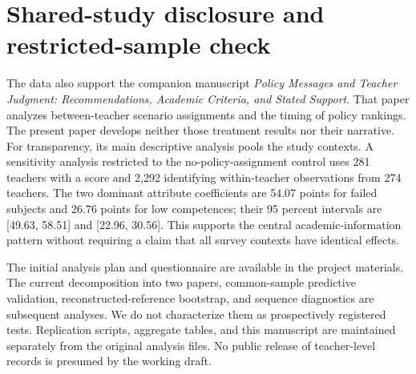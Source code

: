 \section{Shared-study disclosure and restricted-sample check}\label{app:scope}
\begin{addition}
The data also support the companion manuscript \textit{Policy Messages and Teacher Judgment: Recommendations, Academic Criteria, and Stated Support}. That paper analyzes between-teacher scenario assignments and the timing of policy rankings. The present paper develops neither those treatment results nor their narrative. For transparency, its main descriptive analysis pools the study contexts. A sensitivity analysis restricted to the no-policy-assignment control uses 281 teachers with a score and 2,292 identifying within-teacher observations from 274 teachers. The two dominant attribute coefficients are 54.07 points for failed subjects and 26.76 points for low competences; their 95 percent intervals are [49.63, 58.51] and [22.96, 30.56]. This supports the central academic-information pattern without requiring a claim that all survey contexts have identical effects.

The initial analysis plan and questionnaire are available in the project materials. The current decomposition into two papers, common-sample predictive validation, reconstructed-reference bootstrap, and sequence diagnostics are subsequent analyses. We do not characterize them as prospectively registered tests. Replication scripts, aggregate tables, and this manuscript are maintained separately from the original analysis files. No public release of teacher-level records is presumed by the working draft.
\end{addition}


